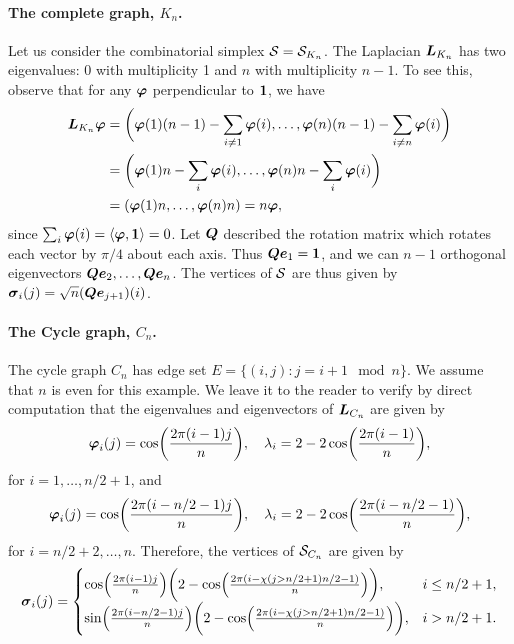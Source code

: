\paragraph{The complete graph, $K_n$.}
Let us consider the combinatorial simplex $\mathcal{S}=\mathcal{S}_{K_n}$.  The Laplacian $\vb*{L}_{K_n}$ has two eigenvalues: 0 with multiplicity 1 and $n$ with multiplicity $n-1$. To see this, observe that for any $\vb*{\varphi}$ perpendicular to $\vb{1}$, we have 
\begin{align*}
\vb*{L}_{K_n}\vb*{\varphi} &= \bigg(\vb*{\varphi}(1)(n-1)-\sum_{i\neq 1}\vb*{\varphi}(i),\dots,\vb*{\varphi}(n)(n-1)-\sum_{i\neq n}\vb*{\varphi}(i)\bigg) \\
&= \bigg(\vb*{\varphi}(1)n - \sum_i \vb*{\varphi}(i), \dots,\vb*{\varphi}(n)n - \sum_i \vb*{\varphi}(i)\bigg) \\
&= (\vb*{\varphi}(1)n,\dots,\vb*{\varphi}(n)n) = n\vb*{\varphi},
\end{align*}
since $\sum_i\vb*{\varphi}(i)=\langle \vb*{\varphi},\vb{1}\rangle =0$. Let $\vb*{Q}$  described the rotation matrix which rotates each vector  by $\pi/4$  about each axis. Thus $\vb*{Q}\vb*{e}_1=\vb{1}$, and we can $n-1$ orthogonal eigenvectors $\vb*{Q}\vb*{e}_2,\dots,\vb*{Q}\vb*{e}_n$. The vertices of $\mathcal{S}$  are thus given by $\vb*{\sigma}_i(j) = \sqrt{n}(\vb*{Q}\vb*{e}_{j+1})(i)$. 

\paragraph{The Cycle graph,  $C_n$.}
The cycle graph $C_n$ has edge set $E=\{(i,j):j=i+1\mod n\}$. We assume that $n$ is even for this example. 
We leave it to the reader to verify by direct computation  that the eigenvalues  and eigenvectors of $\vb*{L}_{C_n}$ are given by 
\[\vb*{\varphi}_i(j) = \cos(\frac{2\pi(i-1)j}{n}),\quad \lambda_i = 2-2\cos(\frac{2\pi(i-1)}{n}),\]
for $i=1,\dots,n/2+1$, and 
\[\vb*{\varphi}_i(j) = \cos(\frac{2\pi(i-n/2-1)j}{n}),\quad \lambda_i = 2-2\cos(\frac{2\pi(i-n/2-1)}{n}),\]
for $i=n/2+2,\dots,n$. Therefore,  the vertices of $\mathcal{S}_{C_n}$ are given by  
\begin{equation*}
\vb*{\sigma}_i(j) = \begin{cases}
\cos(\frac{2\pi(i-1)j}{n})\bigg(2-\cos(\frac{2\pi(i-\chi(j>n/2+1)n/2 -1)}{n})\bigg),& i\leq n/2+1, \\
\sin(\frac{2\pi(i-n/2-1)j}{n})\bigg(2-\cos(\frac{2\pi(i-\chi(j>n/2+1)n/2 -1)}{n})\bigg),& i> n/2+1.
\end{cases}
\end{equation*}


